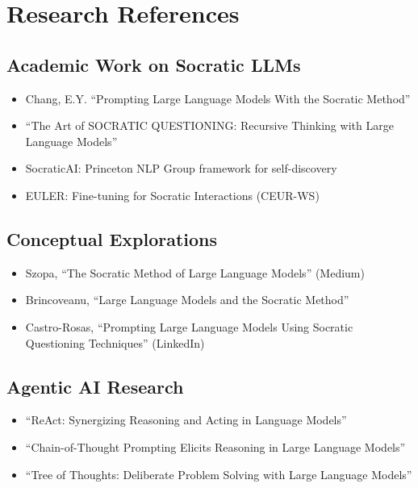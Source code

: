 \chapter{Research References}

\section{Academic Work on Socratic LLMs}

\begin{itemize}
    \item Chang, E.Y. ``Prompting Large Language Models With the Socratic Method'' \cite{chang2023prompting}
    \item ``The Art of SOCRATIC QUESTIONING: Recursive Thinking with Large Language Models'' \cite{qi2023socratic}
    \item SocraticAI: Princeton NLP Group framework for self-discovery
    \item EULER: Fine-tuning for Socratic Interactions (CEUR-WS)
\end{itemize}

\section{Conceptual Explorations}

\begin{itemize}
    \item Szopa, ``The Socratic Method of Large Language Models'' (Medium)
    \item Brincoveanu, ``Large Language Models and the Socratic Method''
    \item Castro-Rosas, ``Prompting Large Language Models Using Socratic Questioning Techniques'' (LinkedIn)
\end{itemize}

\section{Agentic AI Research}

\begin{itemize}
    \item ``ReAct: Synergizing Reasoning and Acting in Language Models'' \cite{yao2022react}
    \item ``Chain-of-Thought Prompting Elicits Reasoning in Large Language Models'' \cite{wei2022chain}
    \item ``Tree of Thoughts: Deliberate Problem Solving with Large Language Models'' \cite{yao2023tree}
\end{itemize}

